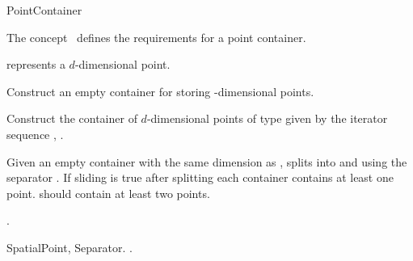 

\begin{ccRefConcept}{PointContainer}


\ccDefinition
  
The concept \ccRefName\ defines the requirements for
a point container. 

\ccParameters

 represents a $d$-dimensional point.


\ccCreation
{}  %

{
Construct an empty container for storing -dimensional points.
}

{
Construct the container of $d$-dimensional points of type 
given by the iterator sequence , .
}

\ccOperations

{Given an empty container  with the same dimension as , splits  into
 and  using the separator . If sliding is true after splitting 
each container contains at least one point.  should contain at least two points.}

\ccHasModels

.

\ccSeeAlso

SpatialPoint, Separator.
.

\end{ccRefConcept}


